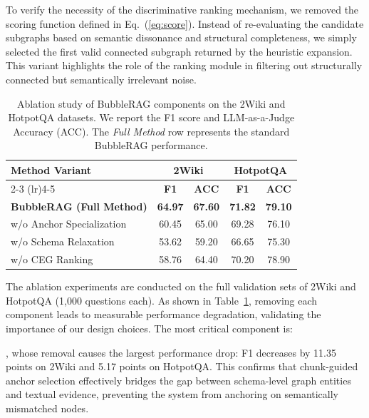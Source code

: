  To verify the necessity of the discriminative ranking mechanism, we removed the scoring function defined in Eq.~(\ref{eq:score}). Instead of re-evaluating the candidate subgraphs based on semantic dissonance and structural completeness, we simply selected the first valid connected subgraph returned by the heuristic expansion. This variant highlights the role of the ranking module in filtering out structurally connected but semantically irrelevant noise.

\begin{table}[t]
    \centering
    \caption{Ablation study of BubbleRAG components on the 2Wiki and HotpotQA datasets. We report the F1 score and LLM-as-a-Judge Accuracy (ACC). The \textit{Full Method} row represents the standard BubbleRAG performance.}
    \label{tab:ablation_results}
    \begin{tabular}{lcccc}
    \toprule
    \multirow{2}{*}{\textbf{Method Variant}} & \multicolumn{2}{c}{\textbf{2Wiki}} & \multicolumn{2}{c}{\textbf{HotpotQA}} \\
    \cmidrule(lr){2-3} \cmidrule(lr){4-5}
     & \textbf{F1} & \textbf{ACC} & \textbf{F1} & \textbf{ACC} \\
    \midrule
    \textbf{BubbleRAG (Full Method)} & \textbf{64.97} & \textbf{67.60} & \textbf{71.82} & \textbf{79.10} \\
    \midrule
    w/o Anchor Specialization & 60.45 & 65.00 & 69.28 & 76.10 \\
    w/o Schema Relaxation & 53.62 & 59.20 & 66.65 & 75.30 \\
    w/o CEG Ranking & 58.76& 64.40 & 70.20 & 78.90 \\
    \bottomrule
    \end{tabular}
\end{table}

The ablation experiments are conducted on the full validation sets of 2Wiki and HotpotQA (1,000 questions each). As shown in Table~\ref{tab:ablation_results}, removing each component leads to measurable performance degradation, validating the importance of our design choices. The most critical component is:

, whose removal causes the largest performance drop: F1 decreases by 11.35 points on 2Wiki and 5.17 points on HotpotQA. This confirms that chunk-guided anchor selection effectively bridges the gap between schema-level graph entities and textual evidence, preventing the system from anchoring on semantically mismatched nodes.

